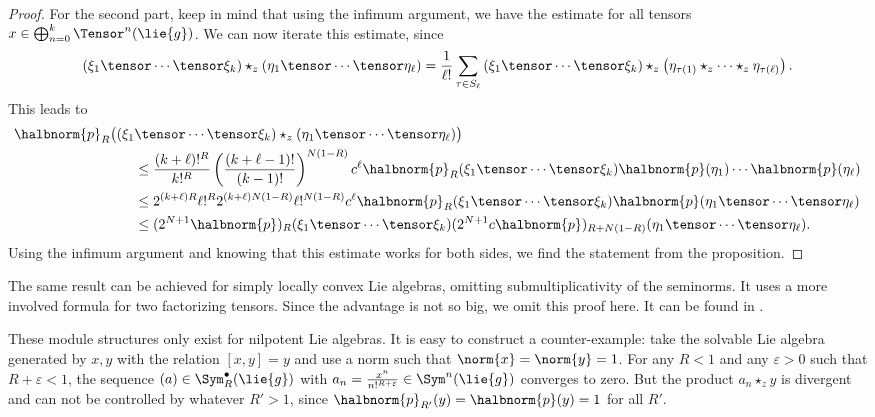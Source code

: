 \documentclass[
11pt,                          %
english                        %
]{article}
\begin{document}
\begin{proof}
	For the second part, keep in mind that using the infimum argument, we have the 
	estimate for all tensors $x \in \bigoplus_{n=0}^k \Tensor^n(\lie{g})$. We can 
	now iterate this estimate, since
	\begin{equation*}
		\left( \xi_1 \tensor \cdots \tensor \xi_k \right)
		\star_z
		\left( \eta_1 \tensor \cdots \tensor \eta_\ell \right)
		=
		\frac{1}{\ell!}
		\sum\limits_{\tau \in S_\ell}
		\left( \xi_1 \tensor \cdots \tensor \xi_k \right)
		\star_z
		\left( \eta_{\tau(1)} \star_z \cdots \star_z \eta_{\tau(\ell)} \right).
	\end{equation*}
	This leads to
	\begin{align*}
		\halbnorm{p}_R
		\big(
			(\xi_1
		&	
			 \tensor \cdots \tensor \xi_k )
			 \star_z 
			 (\eta_1 \tensor \cdots \tensor \eta_\ell)
		\big)
		\\
		& \leq
		\frac{(k + \ell)!^R}{k!^R}
		\left(
			\frac{(k + \ell - 1)!}{(k - 1)!}
		\right)^{N (1 - R)}
		c^\ell
		\halbnorm{p}_R( \xi_1 \tensor \cdots \tensor \xi_k )
		\halbnorm{p}( \eta_1 ) \cdots \halbnorm{p} ( \eta_\ell )
		\\
		& \leq
		2^{(k + \ell) R}
		\ell!^R
		2^{(k + \ell) N (1 - R)}
		\ell!^{N (1 - R)}
		c^\ell
		\halbnorm{p}_R( \xi_1 \tensor \cdots \tensor \xi_k )
		\halbnorm{p}( \eta_1 \tensor \cdots \tensor \eta_\ell )
		\\
		& \leq
		(2^{N + 1} \halbnorm{p})_R
		( \xi_1 \tensor \cdots \tensor \xi_k )
		(2^{N + 1} c \halbnorm{p})_{R + N (1 - R)}
		( \eta_1 \tensor \cdots \tensor \eta_\ell ).
	\end{align*}
	Using the infimum argument and knowing that this estimate works for both sides,
	we find the statement from the proposition.
\end{proof}
\begin{remark}
	The same result can be achieved for simply locally convex Lie algebras, omitting 
	submultiplicativity of the seminorms. It uses a more 
	involved formula for two factorizing tensors. Since the advantage is not so big,
	we omit this proof here. It can be found in \cite{stapor:2015a}.
\end{remark}
These module structures only exist for nilpotent Lie algebras. It is easy 
to construct a counter-example: take the solvable Lie algebra generated by $x, y$ 
with the relation $[x,y] = y$ and use a norm such that $\norm{x} = \norm{y} = 1$. 
For any $R < 1$ and any $\varepsilon > 0$ such that $R + \varepsilon < 1$, the 
sequence $(a) \in \Sym_R^{\bullet}(\lie{g})$ with $a_n = \frac{x^n}{n!^{R + 
\varepsilon}} \in \Sym^n(\lie{g})$ converges to zero. But the product $a_n \star_z 
y$ is divergent and can not be controlled by whatever $R' > 1$, since 
$\halbnorm{p}_{R'}(y) = \halbnorm{p}(y) = 1$ for all $R'$.
\end{document}
